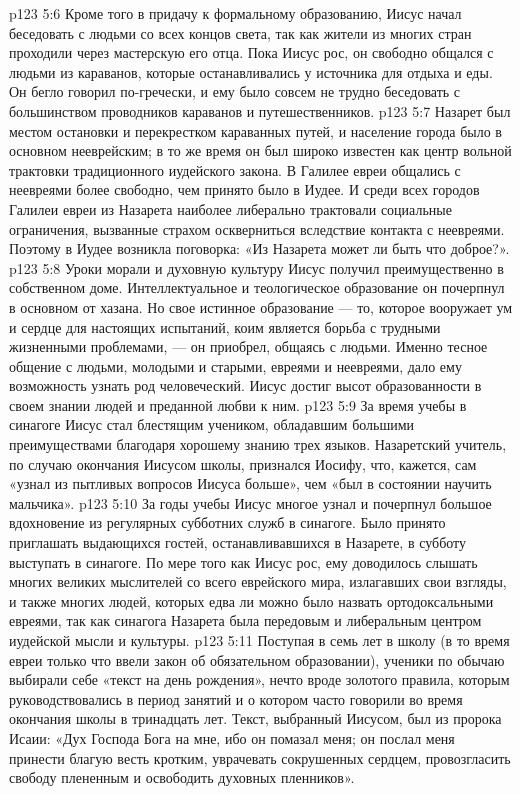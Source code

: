 \vs p123 5:6 \pc Кроме того в придачу к формальному образованию, Иисус начал беседовать с людьми со всех концов света, так как жители из многих стран проходили через мастерскую его отца. Пока Иисус рос, он свободно общался с людьми из караванов, которые останавливались у источника для отдыха и еды. Он бегло говорил по\hyp{}гречески, и ему было совсем не трудно беседовать с большинством проводников караванов и путешественников.
\vs p123 5:7 Назарет был местом остановки и перекрестком караванных путей, и население города было в основном нееврейским; в то же время он был широко известен как центр вольной трактовки традиционного иудейского закона. В Галилее евреи общались с неевреями более свободно, чем принято было в Иудее. И среди всех городов Галилеи евреи из Назарета наиболее либерально трактовали социальные ограничения, вызванные страхом оскверниться вследствие контакта с неевреями. Поэтому в Иудее возникла поговорка: «Из Назарета может ли быть что доброе?».
\vs p123 5:8 Уроки морали и духовную культуру Иисус получил преимущественно в собственном доме. Интеллектуальное и теологическое образование он почерпнул в основном от хазана. Но свое истинное образование --- то, которое вооружает ум и сердце для настоящих испытаний, коим является борьба с трудными жизненными проблемами, --- он приобрел, общаясь с людьми. Именно тесное общение с людьми, молодыми и старыми, евреями и неевреями, дало ему возможность узнать род человеческий. Иисус достиг высот образованности в своем знании людей и преданной любви к ним.
\vs p123 5:9 \pc За время учебы в синагоге Иисус стал блестящим учеником, обладавшим большими преимуществами благодаря хорошему знанию трех языков. Назаретский учитель, по случаю окончания Иисусом школы, признался Иосифу, что, кажется, сам «узнал из пытливых вопросов Иисуса больше», чем «был в состоянии научить мальчика».
\vs p123 5:10 За годы учебы Иисус многое узнал и почерпнул большое вдохновение из регулярных субботних служб в синагоге. Было принято приглашать выдающихся гостей, останавливавшихся в Назарете, в субботу выступать в синагоге. По мере того как Иисус рос, ему доводилось слышать многих великих мыслителей со всего еврейского мира, излагавших свои взгляды, и также многих людей, которых едва ли можно было назвать ортодоксальными евреями, так как синагога Назарета была передовым и либеральным центром иудейской мысли и культуры.
\vs p123 5:11 Поступая в семь лет в школу (в то время евреи только что ввели закон об обязательном образовании), ученики по обычаю выбирали себе «текст на день рождения», нечто вроде золотого правила, которым руководствовались в период занятий и о котором часто говорили во время окончания школы в тринадцать лет. Текст, выбранный Иисусом, был из пророка Исаии: «Дух Господа Бога на мне, ибо он помазал меня; он послал меня принести благую весть кротким, уврачевать сокрушенных сердцем, провозгласить свободу плененным и освободить духовных пленников».
